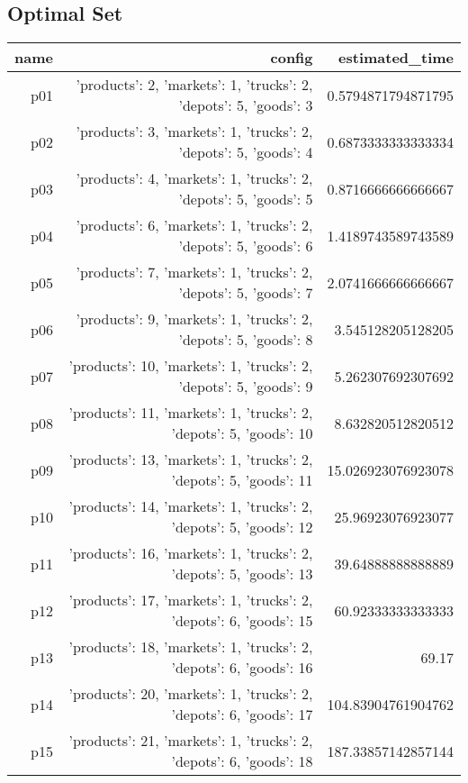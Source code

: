 \documentclass{article}
\begin{document}
                                \subsection*{Optimal Set}
                                
                            \begin{center}
                            \scriptsize
                            \begin{tabular}{r|r|r}
                            name & config & estimated\_time\\\midrule
                              p01&{'products': 2, 'markets': 1, 'trucks': 2, 'depots': 5, 'goods': 3}&0.5794871794871795\\
  p02&{'products': 3, 'markets': 1, 'trucks': 2, 'depots': 5, 'goods': 4}&0.6873333333333334\\
  p03&{'products': 4, 'markets': 1, 'trucks': 2, 'depots': 5, 'goods': 5}&0.8716666666666667\\
  p04&{'products': 6, 'markets': 1, 'trucks': 2, 'depots': 5, 'goods': 6}&1.4189743589743589\\
  p05&{'products': 7, 'markets': 1, 'trucks': 2, 'depots': 5, 'goods': 7}&2.0741666666666667\\
  p06&{'products': 9, 'markets': 1, 'trucks': 2, 'depots': 5, 'goods': 8}&3.545128205128205\\
  p07&{'products': 10, 'markets': 1, 'trucks': 2, 'depots': 5, 'goods': 9}&5.262307692307692\\
  p08&{'products': 11, 'markets': 1, 'trucks': 2, 'depots': 5, 'goods': 10}&8.632820512820512\\
  p09&{'products': 13, 'markets': 1, 'trucks': 2, 'depots': 5, 'goods': 11}&15.026923076923078\\
  p10&{'products': 14, 'markets': 1, 'trucks': 2, 'depots': 5, 'goods': 12}&25.96923076923077\\
  p11&{'products': 16, 'markets': 1, 'trucks': 2, 'depots': 5, 'goods': 13}&39.64888888888889\\
  p12&{'products': 17, 'markets': 1, 'trucks': 2, 'depots': 6, 'goods': 15}&60.92333333333333\\
  p13&{'products': 18, 'markets': 1, 'trucks': 2, 'depots': 6, 'goods': 16}&69.17\\
  p14&{'products': 20, 'markets': 1, 'trucks': 2, 'depots': 6, 'goods': 17}&104.83904761904762\\
  p15&{'products': 21, 'markets': 1, 'trucks': 2, 'depots': 6, 'goods': 18}&187.33857142857144\\

\end{tabular}
\end{center}
\end{document}
